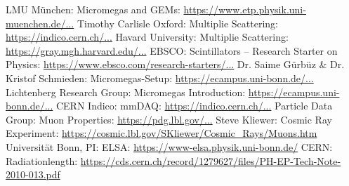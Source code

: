 \documentclass[sn-mathphys-num,iicol]{sn-jnl}
\theoremstyle{thmstyleone}
\theoremstyle{thmstyletwo}
\theoremstyle{thmstylethree}
\begin{document}
 
 
% 
\newpage
\begin{thebibliography}{9}

LMU München: Micromegas and GEMs: 
\href{https://www.etp.physik.uni-muenchen.de/research/detector-development/mm-and-gems/index.html}{https://www.etp.physik.uni-muenchen.de/...}
Timothy Carlisle Oxford: Multiplie Scattering: 
\href{https://indico.cern.ch/event/190654/contributions/345614/attachments/270741/378860/CM33_ScatteringOverview.pdf}{https://indico.cern.ch/...}
Havard University: Multiplie Scattering: 
\href{https://gray.mgh.harvard.edu/media/com_dpattachments/attachments/com_content.article/Techniques-of-Proton-Radiotherapy-06-Multiple-Scattering.pdf}{https://gray.mgh.harvard.edu/...}
EBSCO: Scintillators – Research Starter on Physics: 
\href{https://www.ebsco.com/research-starters/physics/scintillators}{https://www.ebsco.com/research-starters/...}
Dr. Saime Gürbüz \& Dr. Kristof Schmieden: Micromegas-Setup: 
\href{https://ecampus.uni-bonn.de/ilias.php?baseClass=ilrepositorygui&cmd=sendfile&ref_id=3786906}{https://ecampus.uni-bonn.de/...}
Lichtenberg Research Group: Micromegas Introduction: 
\href{https://ecampus.uni-bonn.de/ilias.php?baseClass=ilrepositorygui&cmd=sendfile&ref_id=3787243}{https://ecampus.uni-bonn.de/...}
CERN Indico: mmDAQ: 
\href{https://indico.cern.ch/event/240381/contributions/1554638/attachments/406597/564873/20130307-mmdaq1-flow-review-1.pdf}{https://indico.cern.ch/...}
Particle Data Group: Muon Properties: 
\href{https://pdg.lbl.gov/2023/listings/rpp2023-list-muon.pdf}{https://pdg.lbl.gov/...}
Steve Kliewer: Cosmic Ray Experiment:
\href{https://cosmic.lbl.gov/SKliewer/Cosmic_Rays/Muons.htm}{https://cosmic.lbl.gov/SKliewer/Cosmic\_Rays/Muons.htm}
Universität Bonn, PI: ELSA:
\href{https://www-elsa.physik.uni-bonn.de/}{https://www-elsa.physik.uni-bonn.de/}
CERN: Radiationlength:
\href{https://cds.cern.ch/record/1279627/files/PH-EP-Tech-Note-2010-013.pdf}{https://cds.cern.ch/record/1279627/files/PH-EP-Tech-Note-2010-013.pdf}


\end{thebibliography}
\end{document}

